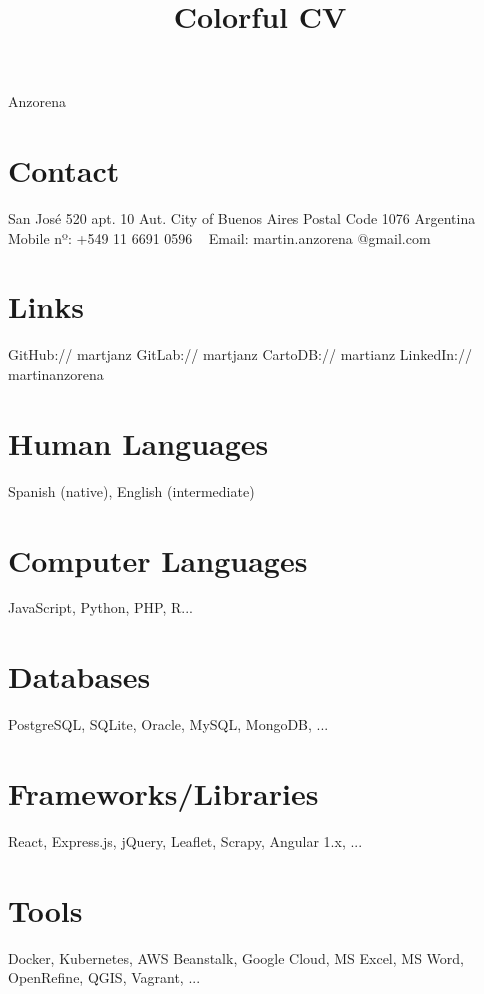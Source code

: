 \documentclass[]{cv-style}          %
\begin{document}
\title{Colorful CV}

 {Anzorena}           %
\lastupdated


\begin{aside}
%
\section{Contact}
San José 520 apt. 10
Aut. City of Buenos Aires
Postal Code 1076
Argentina
~
Mobile nº:
+549 11 6691 0596
~
Email:
martin.anzorena
@gmail.com
%
\section{Links} 
GitHub:// martjanz
GitLab:// martjanz
CartoDB:// martianz
LinkedIn:// martinanzorena
%
\section{Human
Languages}
Spanish (native),
English (intermediate)
%
\section{Computer
   Languages}
JavaScript, Python,
PHP, R...
%
\section{Databases}
PostgreSQL, SQLite,
Oracle, MySQL, 
MongoDB, ...
%
\section{Frameworks/Libraries}
React, Express.js,
jQuery, Leaflet, Scrapy,
Angular 1.x, ... 
%
\section{Tools}
Docker,
Kubernetes,
AWS Beanstalk,
Google Cloud,
MS Excel, MS Word,
OpenRefine,
QGIS, Vagrant, ...
%
\end{aside}


{\vspace{+0.4cm}}
\end{document}
